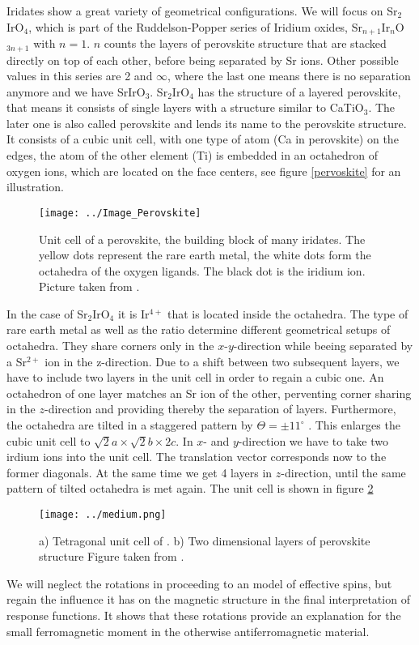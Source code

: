 Iridates show a great variety of geometrical configurations. 
We will focus on Sr$_2$IrO$_4$, which is part of the Ruddelson-Popper series of Iridium oxides, Sr$_{n+1}$Ir$_{n}$O$_{3n+1}$ with $n =1$. 
$n$ counts the layers of perovskite structure that are stacked directly on top of each other, 
before being separated by Sr ions. 
Other possible values in this series are 2 and $\infty$, where the last one means there is no separation anymore and we have SrIrO$_3$. 
Sr$_2$IrO$_4$ has the structure of a layered perovskite, that means it consists of single layers with a structure similar to CaTiO$_3$.
The later one is also called perovskite and lends its name to the perovskite structure.
It consists of a cubic unit cell, with one type of atom (Ca in perovskite) on the edges, 
the  atom of the other element (Ti) is embedded in an octahedron of 
oxygen ions, which are located on the face centers, see figure \ref{pervoskite} for an illustration.
%
\begin{figure}[!htbp]
 \centering
 \texttt{[image: ../Image\_Perovskite]}
 \caption{Unit cell of a perovskite, the building block of many iridates. The yellow dots represent the rare earth metal, the white dots form the octahedra of the oxygen ligands. The black dot is the iridium ion.
	  Picture taken from \cite{Perovskitebilde}.}
	  \label{perovskite}
\end{figure}
%
In the case of Sr$_2$IrO$_4$ it is Ir$^{4+}$ that is located  inside the octahedra. 
The type of rare earth metal as well as the ratio determine different geometrical setups of octahedra. 
They share corners only in the $x$-$y$-direction while beeing separated by a Sr$^{2+}$ ion in the z-direction.
Due to a shift between two subsequent layers, we have to include two layers in the unit cell in order to regain a cubic one.
An octahedron of one layer matches an Sr ion of the other, perventing  corner sharing in the $z$-direction and providing thereby the separation of layers. 
% 
Furthermore, the octahedra are tilted in a staggered pattern by $\Theta = \pm 11^{\circ}$ \cite{PhysRevB.49.9198}.
This enlarges the cubic unit cell to $\sqrt2 a\times\sqrt 2b \times 2c$.
In $x$- and $y$-direction we have to take two irdium ions into the unit cell. The translation vector corresponds now to the former diagonals.
At the same time we get 4 layers in $z$-direction, until the same pattern of tilted octahedra is met again. The unit cell is shown in figure \ref{unitcell}
%
\begin{figure}
\centering
\texttt{[image: ../medium.png]}
\caption{a) Tetragonal unit cell of \Sriro. \quad b) Two dimensional layers of perovskite structure \newline Figure taken from \cite{PhysRevLett.108.177003}.}
\label{unitcell}
\end{figure}
%
We will neglect the rotations in proceeding to an model of effective spins, but regain the influence it has on the magnetic structure in the final interpretation of 
response functions. It shows that these rotations provide an explanation for the small ferromagnetic moment in the otherwise antiferromagnetic material. 


